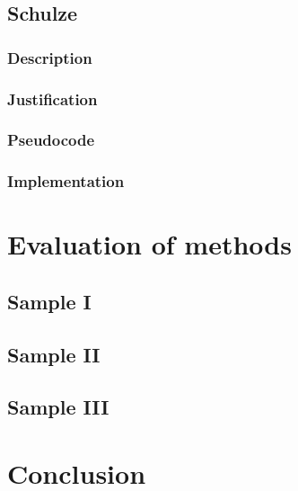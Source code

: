 \subsection{Schulze}
\subsubsection{Description}
\subsubsection{Justification}
\subsubsection{Pseudocode}
\subsubsection{Implementation}

\section{Evaluation of methods}
\subsection{Sample I}
\subsection{Sample II}
\subsection{Sample III}

\section{Conclusion}





%




